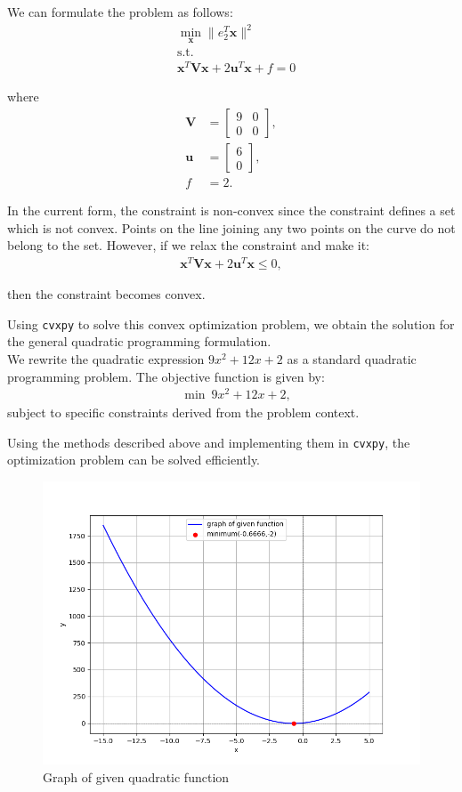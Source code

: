 \documentclass[article]{IEEEtran}
\numberwithin{figure}{enumi}
\begin{document}
We can formulate the problem as follows:
\begin{align}
    &\min_{\mathbf{x}} \|e_2^T \mathbf{x}\|^2 \\
    &\text{s.t.} \\
    &\mathbf{x}^T \mathbf{V} \mathbf{x} + 2 \mathbf{u}^T \mathbf{x} + f = 0
\end{align}

where
\begin{align}
    \mathbf{V} &= \begin{bmatrix} 9 & 0 \\
    0 & 0 \end{bmatrix}, \\
    \mathbf{u} &= \begin{bmatrix} 6 \\
    0 \end{bmatrix}, \\
    f &= 2.
\end{align}

In the current form, the constraint is non-convex since the constraint defines a set which is not convex. Points on the line joining any two points on the curve do not belong to the set. However, if we relax the constraint and make it:
\begin{align}
    \mathbf{x}^T \mathbf{V} \mathbf{x} + 2 \mathbf{u}^T \mathbf{x} \leq 0,
\end{align}

then the constraint becomes convex.

Using \texttt{cvxpy} to solve this convex optimization problem, we obtain the solution for the general quadratic programming formulation. \\
We rewrite the quadratic expression $9x^2 + 12x + 2$ as a standard quadratic programming problem. The objective function is given by:
\begin{align}
    &\min \ 9x^2 + 12x + 2,
\end{align}
subject to specific constraints derived from the problem context.

Using the methods described above and implementing them in \texttt{cvxpy}, the optimization problem can be solved efficiently.
\begin{figure}[h!]
	\centering
	\includegraphics[width=\columnwidth]{figures/Figure_1.png}
	\caption{Graph of given quadratic function}
	\label{stemplot}
\end{figure}
\end{document}
